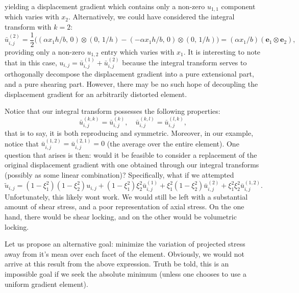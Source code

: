 \documentclass[11pt]{article} %
\begin{document}
yielding a displacement gradient which contains only a non-zero $u_{1,1}$ component which varies with $x_2$. Alternatively, we could have considered the integral transform with $k = 2$:
\begin{equation}
	\bar{u}_{i,j}^{(2)} =\frac{1}{2} \bigg( (\alpha x_1 h / b, \, 0) \otimes (0, \, 1/h) - (-\alpha x_1 h / b, \, 0) \otimes (0, \, 1/h) \bigg) = (\alpha x_1 / b) (\mathbf{e}_1 \otimes \mathbf{e}_2),
\end{equation}
providing only a non-zero $u_{1,2}$ entry which varies with $x_1$. It is interesting to note that in this case, $u_{i,j} = \bar{u}_{i,j}^{(1)} + \bar{u}_{i,j}^{(2)}$ because the integral transform serves to orthogonally decompose the displacement gradient into a pure extensional part, and a pure shearing part. However, there may be no such hope of decoupling the displacement gradient for an arbitrarily distorted element.

Notice that our integral transform possesses the following properties:
\begin{equation}
	\bar{u}^{(k,k)}_{i,j} = \bar{u}^{(k)}_{i,j}, \quad \bar{u}^{(k,l)}_{i,j} = \bar{u}^{(l,k)}_{i,j},
\end{equation}
that is to say, it is both reproducing and symmetric. Moreover, in our example, notice that $\bar{u}_{i,j}^{(1,2)} = \bar{u}_{i,j}^{(2,1)} = 0$ (the average over the entire element). One question that arises is then: would it be feasible to consider a replacement of the original displacement gradient with one obtained through our integral transforms (possibly as some linear combination)? Specifically, what if we attempted
\begin{equation}
	\tilde{u}_{i,j} = (1-\xi_1^2) (1-\xi_2^2) u_{i,j} + (1-\xi_1^2) \xi_2^2 \bar{u}^{(1)}_{i,j} + \xi_1^2  (1-\xi_2^2) \bar{u}^{(2)}_{i,j} + \xi_1^2  \xi_2^2 \bar{u}^{(1,2)}_{i,j}.
\end{equation}
Unfortunately, this likely wont work. We would still be left with a substantial amount of shear stress, and a poor representation of axial stress. On the one hand, there would be shear locking, and on the other would be volumetric locking.

Let us propose an alternative goal: minimize the variation of projected stress away from it's mean over each facet of the element. Obviously, we would not arrive at this result from the above expression. Truth be told, this is an impossible goal if we seek the absolute minimum (unless one chooses to use a uniform gradient element).
\end{document}
